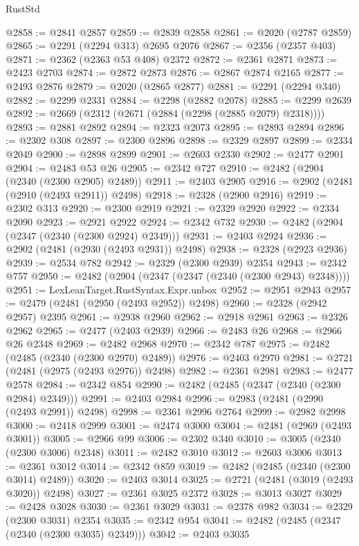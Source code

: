 \begin{lexlean}{RustStd}
\begin{coremodule}
{\begin{coremodule}
{{{{{{{{{{{{{{{{{{{{{{{{{{{{{{{{{{{{{@2858 := @2841 @2857
@2859 := @2839 @2858
@2861 := @2020 (@2787 @2859)
@2865 := @2291 (@2294 @313) @2695 @2076
@2867 := @2356 (@2357 @403)
@2871 := @2362 (@2363 @53 @408) @2372
@2872 := @2361 @2871
@2873 := @2423 @2703
@2874 := @2872 @2873
@2876 := @2867 @2874 @2165
@2877 := @2493 @2876
@2879 := @2020 (@2865 @2877)
@2881 := @2291 (@2294 @340)
@2882 := @2299 @2331
@2884 := @2298 (@2882 @2078)
@2885 := @2299 @2639
@2892 := @2669 (@2312 (@2671 (@2884 (@2298 (@2885 @2079) @2318))))
@2893 := @2881 @2892
@2894 := @2323 @2073
@2895 := @2893 @2894
@2896 := @2302 @308
@2897 := @2300 @2896
@2898 := @2329 @2897
@2899 := @2334 @2049
@2900 := @2898 @2899
@2901 := @2603 @2330
@2902 := @2477 @2901
@2904 := @2483 @53 @26
@2905 := @2342 @727
@2910 := @2482 (@2904 (@2340 (@2300 @2905) @2489))
@2911 := @2403 @2905
@2916 := @2902 (@2481 (@2910 (@2493 @2911)) @2498)
@2918 := @2328 (@2900 @2916)
@2919 := @2302 @313
@2920 := @2300 @2919
@2921 := @2329 @2920
@2922 := @2334 @2090
@2923 := @2921 @2922
@2924 := @2342 @732
@2930 := @2482 (@2904 (@2347 (@2340 (@2300 @2924) @2349)))
@2931 := @2403 @2924
@2936 := @2902 (@2481 (@2930 (@2493 @2931)) @2498)
@2938 := @2328 (@2923 @2936)
@2939 := @2534 @782
@2942 := @2329 (@2300 @2939) @2354
@2943 := @2342 @757
@2950 := @2482 (@2904 (@2347 (@2347 (@2340 (@2300 @2943) @2348))))
@2951 := LexLeanTarget.RustSyntax.Expr.unbox
@2952 := @2951 @2943
@2957 := @2479 (@2481 (@2950 (@2493 @2952)) @2498)
@2960 := @2328 (@2942 @2957) @2395
@2961 := @2938 @2960
@2962 := @2918 @2961
@2963 := @2326 @2962
@2965 := @2477 (@2403 @2939)
@2966 := @2483 @26
@2968 := @2966 @26 @2348
@2969 := @2482 @2968
@2970 := @2342 @787
@2975 := @2482 (@2485 (@2340 (@2300 @2970) @2489))
@2976 := @2403 @2970
@2981 := @2721 (@2481 (@2975 (@2493 @2976)) @2498)
@2982 := @2361 @2981
@2983 := @2477 @2578
@2984 := @2342 @854
@2990 := @2482 (@2485 (@2347 (@2340 (@2300 @2984) @2349)))
@2991 := @2403 @2984
@2996 := @2983 (@2481 (@2990 (@2493 @2991)) @2498)
@2998 := @2361 @2996 @2764
@2999 := @2982 @2998
@3000 := @2418 @2999
@3001 := @2474 @3000
@3004 := @2481 (@2969 (@2493 @3001))
@3005 := @2966 @99
@3006 := @2302 @340
@3010 := @3005 (@2340 (@2300 @3006) @2348)
@3011 := @2482 @3010
@3012 := @2603 @3006
@3013 := @2361 @3012
@3014 := @2342 @859
@3019 := @2482 (@2485 (@2340 (@2300 @3014) @2489))
@3020 := @2403 @3014
@3025 := @2721 (@2481 (@3019 (@2493 @3020)) @2498)
@3027 := @2361 @3025 @2372
@3028 := @3013 @3027
@3029 := @2428 @3028
@3030 := @2361 @3029
@3031 := @2378 @982
@3034 := @2329 (@2300 @3031) @2354
@3035 := @2342 @954
@3041 := @2482 (@2485 (@2347 (@2340 (@2300 @3035) @2349)))
@3042 := @2403 @3035
}}}}}}}}}}}}}}}}}}}}}}}}}}}}}}}}}}}}}
\end{coremodule}}
\end{coremodule}
\end{lexlean}
